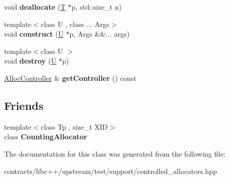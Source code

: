\begin{DoxyCompactItemize}
void {\bfseries deallocate} (\mbox{\hyperlink{struct_t}{T}} $\ast$p, std\+::size\+\_\+t n)
\item 
\mbox{\label{class_counting_allocator_a84d39b7526e1f13775cef1c51745c9d8}} 
{\footnotesize template$<$class U , class ... Args$>$ }\\void {\bfseries construct} (\mbox{\hyperlink{union_u}{U}} $\ast$p, Args \&\&... args)
\item 
\mbox{\label{class_counting_allocator_ae704aa553579530dc9318478d094642e}} 
{\footnotesize template$<$class U $>$ }\\void {\bfseries destroy} (\mbox{\hyperlink{union_u}{U}} $\ast$p)
\item 
\mbox{\label{class_counting_allocator_ac87ff568f7ca8abd714153a993be4687}} 
\mbox{\hyperlink{struct_alloc_controller}{Alloc\+Controller}} \& {\bfseries get\+Controller} () const
\end{DoxyCompactItemize}
\subsection*{Friends}
\begin{DoxyCompactItemize}
\item 
\mbox{\label{class_counting_allocator_a9bd3e3072fa25d4552e216a50089ffb7}} 
{\footnotesize template$<$class Tp , size\+\_\+t X\+ID$>$ }\\class {\bfseries Counting\+Allocator}
\end{DoxyCompactItemize}


The documentation for this class was generated from the following file\+:\begin{DoxyCompactItemize}
\item 
contracts/libc++/upstream/test/support/controlled\+\_\+allocators.\+hpp\end{DoxyCompactItemize}
